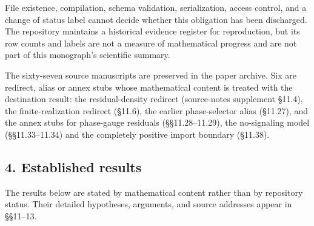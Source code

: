 \documentclass[
  11pt,
]{article}
\begin{document}
File existence, compilation, schema validation, serialization, access
control, and a change of status label cannot decide whether this
obligation has been discharged. The repository maintains a historical
evidence register for reproduction, but its row counts and labels are
not a measure of mathematical progress and are not part of this
monograph's scientific summary.

The sixty-seven source manuscripts are preserved in the paper archive.
Six are redirect, alias or annex stubs whose mathematical content is
treated with the destination result: the residual-density redirect
(source-notes supplement §11.4), the finite-realization redirect
(§11.6), the earlier phase-selector alias (§11.27), and the annex stubs
for phase-gauge residuals (§§11.28--11.29), the no-signaling model
(§§11.33--11.34) and the completely positive import boundary (§11.38).

\subsection{4. Established results}\label{established-results}

The results below are stated by mathematical content rather than by
repository status. Their detailed hypotheses, arguments, and source
addresses appear in §§11--13.
\end{document}
